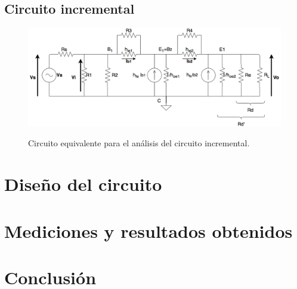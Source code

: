 	\subsection{Circuito incremental}
	
		\begin{figure}[H]
			\centering
			\includegraphics[scale=0.4]{../circ_incremental.png} \\
			\caption{Circuito equivalente para el an\'alisis del circuito incremental.}
			\label{circ_incremental}
		\end{figure}

\section{Diseño del circuito}

\section{Mediciones y resultados obtenidos}

\section{Conclusi\'on}




